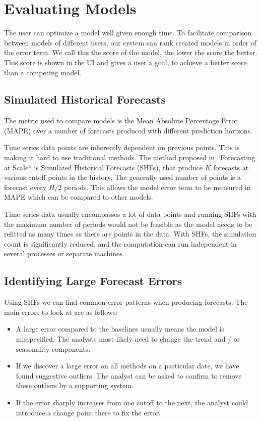 \section{Evaluating Models}

The user can optimize a model well given enough time. To facilitate comparison between models of different users, our system can rank created models in order of the error term. We call this the score of the model, the lower the score the better. This score is shown in the UI and gives a user a goal, to achieve a better score than a competing model.

\subsection{Simulated Historical Forecasts}
The metric used to compare models is the Mean Absolute Percentage Error (MAPE) over a number of forecasts produced with different prediction horizons.

Time series data points are inherently dependent on previous points. This is making it hard to use traditional methods. The method proposed in ``Forecasting at Scale`` \cite{b1} is Simulated Historical Forecasts (SHFs), that produce \(K\) forecasts at various cutoff points in the history. The generally used number of points is a forecast every \(H/2\) periods. This allows the model error term to be measured in MAPE which can be compared to other models. 

Time series data usually encompasses a lot of data points and running SHFs with the maximum number of periods would not be feasible as the model needs to be refitted as many times as there are points in the data. With SHFs, the simulation count is significantly reduced, and the computation can run independent in several processes or separate machines.


\subsection{Identifying Large Forecast Errors}

Using SHFs we can find common error patterns when producing forecasts. The main errors to look at are as follows:

\begin{itemize}
    \item A large error compared to the baselines usually means the model is misspecified. The analysts most likely need to change the trend and / or seasonality components.
    \item If we discover a large error on all methods on a particular date, we have found suggestive outliers. The analyst can be asked to confirm to remove these outliers by a supporting system.
    \item If the error sharply increases from one cutoff to the next, the analyst could introduce a change point there to fix the error.
\end{itemize}

